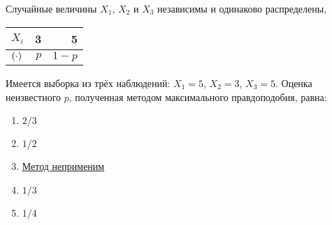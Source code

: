 \documentclass[t]{beamer}
\let\P\relax
\DeclareMathOperator{\P}{\mathbb{P}}
\begin{document}
 \begin{frame} \label{32} 
\begin{block}{32} 

  Случайные величины $X_1$, $X_2$ и $X_3$ независимы и одинаково распределены,

\begin{center}
  \begin{tabular}{lrr} \toprule
  $X_i$ & 3 & 5 \\
  \midrule
  $\P(\cdot)$ & $p$ & $1-p$ \\
  \bottomrule
  \end{tabular}
\end{center}

  Имеется выборка из трёх наблюдений: $X_1=5$, $X_2=3$, $X_3=5$. Оценка неизвестного $p$, полученная методом максимального правдоподобия, равна:


  


 \end{block} 
\begin{enumerate} 
\item[] \hyperlink{32-No}{\beamergotobutton{} $2/3$}
\item[] \hyperlink{32-No}{\beamergotobutton{} $1/2$}
\item[] \hyperlink{32-No}{\beamergotobutton{} Метод неприменим}
\item[] \hyperlink{32-Yes}{\beamergotobutton{} $1/3$}
\item[] \hyperlink{32-No}{\beamergotobutton{} $1/4$}
\end{enumerate} 
\end{frame} 
\end{document}
